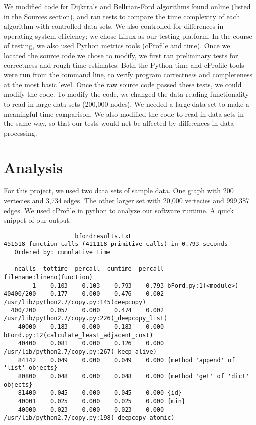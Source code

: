 \documentclass{article}
\begin{document}
We modified code for Dijktra's and Bellman-Ford algorithms found online (listed in the Sources section), and ran tests to compare the time complexity of each algorithm with controlled data sets.  We also controlled for differences in operating system efficiency; we chose Linux as our testing platform.  In the course of testing, we also used Python metrics tools (cProfile and time).  Once we located the source code we chose to modify, we first ran preliminary tests for correctness and rough time estimates.  Both the Python time and cProfile tools were run from the command line, to verify program correctness and completeness at the most basic level.  Once the raw source code passed these tests, we could modify the code.
To modify the code, we changed the data reading functionality to read in large data sets (200,000 nodes).  We needed a large data set to make a meaningful time comparison.
 We also modified the code to read in data sets in the same way, so that our tests would not be affected by differences in data processing.
 

\section{Analysis}
For this project, we used two data sets of sample data. One graph with 200 vertecies and 3,734 edges. The other larger set with 20,000 vertecies and 999,387 edges. We used cProfile in python to analyze our software runtime. A quick snippet of our output:
\begin{verbatim}
                    bfordresults.txt
451518 function calls (411118 primitive calls) in 0.793 seconds
   Ordered by: cumulative time

   ncalls  tottime  percall  cumtime  percall filename:lineno(function)
        1    0.103    0.103    0.793    0.793 bFord.py:1(<module>)
40400/200    0.177    0.000    0.476    0.002 /usr/lib/python2.7/copy.py:145(deepcopy)
  400/200    0.057    0.000    0.474    0.002 /usr/lib/python2.7/copy.py:226(_deepcopy_list)
    40000    0.183    0.000    0.183    0.000 bFord.py:12(calculate_least_adjacent_cost)
    40400    0.081    0.000    0.126    0.000 /usr/lib/python2.7/copy.py:267(_keep_alive)
    84142    0.049    0.000    0.049    0.000 {method 'append' of 'list' objects}
    80800    0.048    0.000    0.048    0.000 {method 'get' of 'dict' objects}
    81400    0.045    0.000    0.045    0.000 {id}
    40001    0.025    0.000    0.025    0.000 {min}
    40000    0.023    0.000    0.023    0.000 /usr/lib/python2.7/copy.py:198(_deepcopy_atomic)
\end{verbatim}
\end{document}
